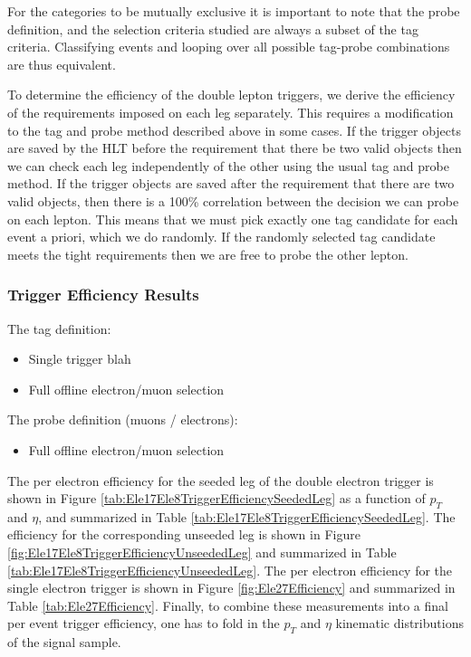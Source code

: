 For the categories to be mutually exclusive it is important to note that the probe definition, 
and the selection criteria studied are always a subset of the tag criteria.
Classifying events and looping over all possible tag-probe combinations are thus equivalent.

To determine the efficiency of the double lepton triggers, we derive the efficiency of the requirements imposed on each leg separately.
This requires a modification to the tag and probe method described above in some cases.
If the trigger objects are saved by the HLT before the requirement that there be two valid objects then
we can check each leg independently of the other using the usual tag and probe method.
If the trigger objects are saved after the requirement that there are two valid objects, then there is 
a 100\% correlation between the decision we can probe on each lepton.
This means that we must pick exactly one tag candidate for each event a priori, which we do 
randomly. 
If the randomly selected tag candidate meets the tight requirements then we are free to 
probe the other lepton.

\subsubsection{Trigger Efficiency Results}

The tag definition:
\begin{itemize}
	\item  Single trigger blah
	\item Full offline electron/muon selection
\end{itemize}
	
The probe definition (muons / electrons):
\begin{itemize}
	\item  Full offline electron/muon selection
\end{itemize}

  
The per electron efficiency for the seeded leg of the double electron trigger is shown in 
Figure \ref{tab:Ele17Ele8TriggerEfficiencySeededLeg} as a function of $p_{T}$ and $\eta$, 
and summarized in Table \ref{tab:Ele17Ele8TriggerEfficiencySeededLeg}. The efficiency for 
the corresponding unseeded leg is shown in Figure 
\ref{fig:Ele17Ele8TriggerEfficiencyUnseededLeg} and summarized in Table 
\ref{tab:Ele17Ele8TriggerEfficiencyUnseededLeg}. The per electron efficiency for the
single electron trigger is shown in Figure \ref{fig:Ele27Efficiency} and summarized
in Table \ref{tab:Ele27Efficiency}. Finally, to combine these measurements into a final per event
trigger efficiency, one has to fold in the $p_{T}$ and $\eta$ kinematic distributions
of the signal sample.


